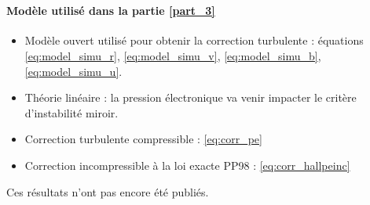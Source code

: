 {\begin{minipage}[c]{\linewidth}
\paragraph{\\Modèle utilisé dans la partie \ref{part_3}} 
\begin{itemize}
\item Modèle ouvert utilisé pour obtenir la correction turbulente : équations \eqref{eq:model_simu_r},  \eqref{eq:model_simu_v}, \eqref{eq:model_simu_b}, \eqref{eq:model_simu_u}.
\item Théorie linéaire : la pression électronique va venir impacter le critère d'instabilité miroir.
\item Correction turbulente compressible : \eqref{eq:corr_pe}
\item Correction incompressible à la loi exacte PP98 : \eqref{eq:corr_hallpeinc}
\end{itemize}
Ces résultats n'ont pas encore été publiés.
\end{minipage}}
